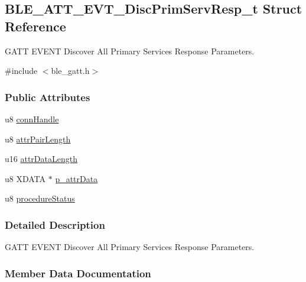 \hypertarget{struct_b_l_e___a_t_t___e_v_t___disc_prim_serv_resp__t}{}\subsection{B\+L\+E\+\_\+\+A\+T\+T\+\_\+\+E\+V\+T\+\_\+\+Disc\+Prim\+Serv\+Resp\+\_\+t Struct Reference}
\label{struct_b_l_e___a_t_t___e_v_t___disc_prim_serv_resp__t}


G\+A\+TT E\+V\+E\+NT Discover All Primary Services Response Parameters.  




{\ttfamily \#include $<$ble\+\_\+gatt.\+h$>$}

\subsubsection*{Public Attributes}
\begin{DoxyCompactItemize}
\item 
u8 \hyperlink{struct_b_l_e___a_t_t___e_v_t___disc_prim_serv_resp__t_a4ed69d02bef9434605532704d7202df4}{conn\+Handle}
\item 
u8 \hyperlink{struct_b_l_e___a_t_t___e_v_t___disc_prim_serv_resp__t_a49681393baa7df0fc61110cee2ff5289}{attr\+Pair\+Length}
\item 
u16 \hyperlink{struct_b_l_e___a_t_t___e_v_t___disc_prim_serv_resp__t_a649f46e30673f2fe2ca7cdf058251386}{attr\+Data\+Length}
\item 
u8 X\+D\+A\+TA $\ast$ \hyperlink{struct_b_l_e___a_t_t___e_v_t___disc_prim_serv_resp__t_aa8dada4dc9e6f30180f2bd19fff41e42}{p\+\_\+attr\+Data}
\item 
u8 \hyperlink{struct_b_l_e___a_t_t___e_v_t___disc_prim_serv_resp__t_ac725e386fdceac6c124b7f8db64369cd}{procedure\+Status}
\end{DoxyCompactItemize}


\subsubsection{Detailed Description}
G\+A\+TT E\+V\+E\+NT Discover All Primary Services Response Parameters. 

\subsubsection{Member Data Documentation}
